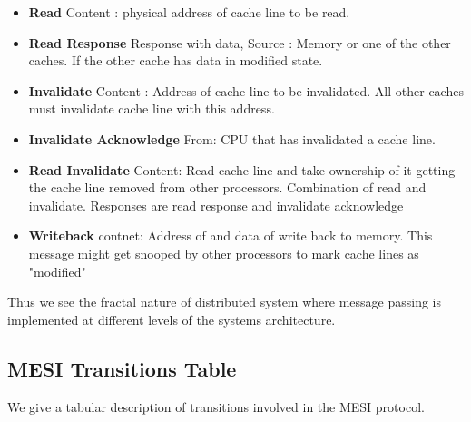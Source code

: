 \documentclass{article}
\begin{document}
\begin{itemize}
\item \textbf{Read} Content : physical address of cache line to be
  read.
\item \textbf{Read Response} Response with data, Source : Memory or
  one of the other caches. If the other cache has data in modified
  state.
\item \textbf{Invalidate} Content : Address of cache line to be
  invalidated. All other caches must invalidate cache line with this
  address.

\item \textbf{Invalidate Acknowledge} From: CPU that has invalidated a
  cache line.

\item \textbf{Read Invalidate} Content: Read cache line and take
  ownership of it getting the cache line removed from other
  processors. Combination of read and invalidate. Responses are read
  response and invalidate acknowledge

\item \textbf{Writeback} contnet: Address of and data of write back to
  memory. This message might get snooped by other processors to mark
  cache lines as "modified"  
\end{itemize}

Thus we see the fractal nature of distributed system where message
passing is implemented at different levels of the systems
architecture.


\subsection{MESI Transitions Table}

We give a tabular description of transitions involved in the MESI
protocol.
\end{document}
